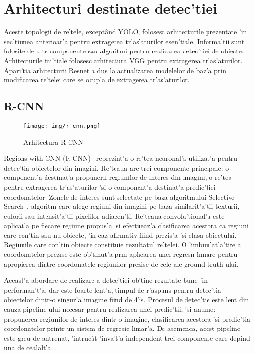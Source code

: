 \documentclass[12pt,a4paper,twoside]{report}
\begin{document}
\section{Arhitecturi destinate detec'tiei}
Aceste topologii de re'tele, except\^and YOLO, folosesc arhitecturile prezentate 'in sec'tiunea anterioar'a pentru extragerea tr'as'aturilor esen'tiale. Informa'tii sunt folosite de alte componente sau algoritmi pentru realizarea detec'tiei de obiecte. Arhitecturile ini'tiale  folosesc arhitectura VGG pentru extragerea tr'as'aturilor. Apari'tia arhitecturii Resnet a dus la actualizarea modelelor de baz'a prin modificarea re'telei care se ocup'a de extragerea tr'as'aturilor.

\subsection{R-CNN}
\begin{figure}[H]
  \texttt{[image: img/r-cnn.png]}
  \centering
  \caption{Arhitectura R-CNN\protect\footnotemark}
\end{figure}

Regions with CNN (R-CNN)~\cite{R-CNN} reprezint'a o re'tea neuronal'a utilizat'a pentru detec'tia obiectelor din imagini. Re'teaua are trei componente principale: o component'a destinat'a propunerii regiunilor de interes din imagini, o re'tea pentru extragerea tr'as'aturilor 'si o component'a destinat'a predic'tiei coordonatelor. Zonele de interes sunt selectate pe baza algoritmului Selective Search~\cite{SelectiveSearch}, algoritm care alege regiuni din imagini pe baza similarit'a'tii texturii, culorii sau intensit'a'tii pixelilor adiacen'ti. Re'teaua convolu'tional'a este aplicat'a pe fiecare regiune propus'a 'si efectueaz'a clasificarea acestora ca regiuni care con'tin sau nu obiecte, 'in caz afirmativ fiind prezis'a 'si clasa obiectului. Regiunile care con'tin obiecte constituie rezultatul re'telei. O 'imbun'at'a'tire a coordonatelor prezise este ob'tinut'a prin aplicarea unei regresii liniare pentru apropierea dintre coordonatele regiunilor prezise de cele ale ground truth-ului. 

Aceast'a abordare de realizare a detec'tiei ob'tine rezultate bune 'in performan't'a, dar este foarte lent'a, timpul de r'aspuns pentru detec'tia obiectelor dintr-o singur'a imagine fiind de 47s. Procesul de detec'tie este lent din cauza pipeline-ului necesar pentru realizarea unei predic'tii, 'si anume: propunerea regiunilor de interes dintr-o imagine, clasificarea acestora 'si predic'tia coordonatelor printr-un sistem de regresie liniar'a.
De asemenea, acest pipeline este greu de antrenat, 'intruc\^at 'inva't'a independent trei componente care depind una de cealalt'a.
\end{document}
